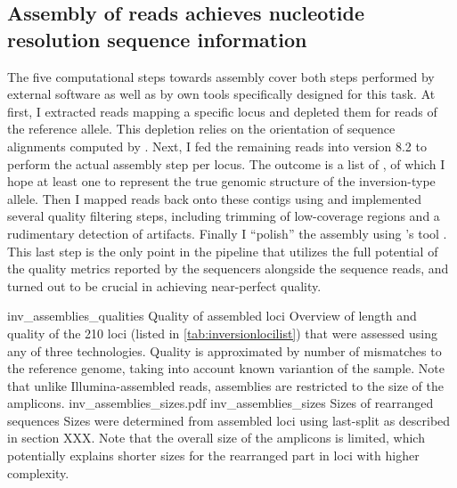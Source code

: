 \subsection{Assembly of \texorpdfstring{\pacbio}{PacBio} reads achieves nucleotide resolution sequence information}
\label{sec:pacbio_assemly}

The five computational steps towards \pacbio assembly cover both steps performed
by external software as well as by own tools specifically designed for this
task. At first, I extracted \pacbio reads mapping a specific locus and depleted
them for reads of the reference allele. This depletion relies on the orientation
of sequence alignments computed by \last. Next, I fed the remaining reads into
\celeraassembler version 8.2 to perform the actual assembly step per locus. The
outcome is a list of ,
of which I hope at least one to represent the true genomic structure of the
inversion-type allele. Then I mapped \pacbio reads back onto these contigs using
\blasr and implemented several quality filtering steps, including trimming of
low-coverage regions and a rudimentary detection of artifacts. Finally I
``polish'' the assembly using \pacbio’s tool \quiver. This last step is the only
point in the pipeline that utilizes the full potential of the quality metrics
reported by the \pacbio sequencers alongside the sequence reads, and turned out
to be crucial in achieving near-perfect quality.


    {inv_assemblies_qualities}
    {Quality of assembled loci}
    {Overview of length and quality of the 210 loci (listed in
    \cref{tab:inversionlocilist}) that were assessed using
    any of three technologies. Quality is approximated by number of mismatches
    to the reference genome, taking into account known variantion of the sample.
    Note that unlike Illumina-assembled reads, \pacbio assemblies are restricted
    to the size of the amplicons.}
        {inv_assemblies_sizes.pdf}
    {inv_assemblies_sizes}
    {Sizes of rearranged sequences}
    {Sizes were determined from assembled loci using \acs{last}-split as
    described in section XXX. Note that the overall size of the amplicons is
    limited, which potentially explains shorter sizes for the rearranged part in
    loci with higher complexity.}


